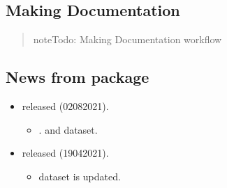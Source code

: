 \documentclass[a4paper,12pt,english]{sphinxhowto}
\begin{document}


\subsection{Making Documentation}
\label{\detokenize{sdam:making-documentation}}\begin{quote}

\begin{sphinxadmonition}{note}{\label{\detokenize{sdam:id5}}Todo:}
Making Documentation workflow
\end{sphinxadmonition}
\end{quote}



\subsection{News from  package}
\label{\detokenize{sdam:news-from-sdam-package}}\label{\detokenize{sdam:news}}\begin{itemize}
\item {} 
  released (02\sphinxhyphen{}08\sphinxhyphen{}2021).
\begin{itemize}
\item {} 
.  and  dataset.

\end{itemize}

\end{itemize}

\begin{itemize}
\item {} 
  released (19\sphinxhyphen{}04\sphinxhyphen{}2021).
\begin{itemize}
\item {} 
 dataset is updated.

\end{itemize}

\end{itemize}
\end{document}
